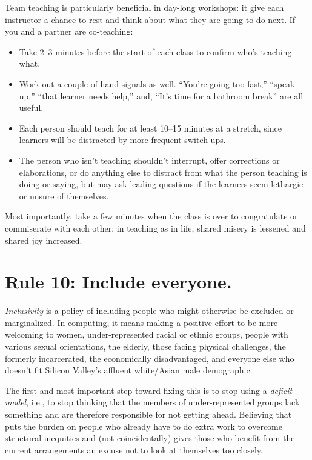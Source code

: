 \documentclass[10pt,letterpaper]{article}
\newcommand{\rulemajor}[1]{\section{#1}}
\begin{document}
Team teaching is particularly beneficial in day-long workshops:
it give each instructor a chance to rest and think about what they are going to do next.
If you and a partner are co-teaching:

\begin{itemize}

\item
  Take 2--3 minutes before the start of each class
  to confirm who's teaching what.

\item
  Work out a couple of hand signals as well.
  ``You're going too fast,''
  ``speak up,''
  ``that learner needs help,''
  and, ``It's time for a bathroom break'' are all useful.

\item
  Each person should teach for at least 10--15 minutes at a stretch,
  since learners will be distracted by more frequent switch-ups.

\item
  The person who isn't teaching shouldn't interrupt,
  offer corrections or elaborations,
  or do anything else to distract from what the person teaching is doing or saying,
  but may ask leading questions
  if the learners seem lethargic or unsure of themselves.

\end{itemize}

Most importantly,
take a few minutes when the class is over to congratulate or commiserate with each other:
in teaching as in life,
shared misery is lessened and shared joy increased.

\rulemajor{Rule 10: Include everyone.}

\emph{Inclusivity} is a policy of including people who might otherwise be excluded or marginalized.
In computing,
it means making a positive effort to be more welcoming to women,
under-represented racial or ethnic groups,
people with various sexual orientations,
the elderly,
those facing physical challenges,
the formerly incarcerated,
the economically disadvantaged,
and everyone else who doesn't fit Silicon Valley's affluent white/Asian male demographic.

The first and most important step toward fixing this is
to stop using a \emph{deficit model},
i.e.,
to stop thinking that the members of under-represented groups lack something
and are therefore responsible for not getting ahead.
Believing that puts the burden on people who already have to do extra work to overcome structural inequities
and (not coincidentally) gives those who benefit from the current arrangements
an excuse not to look at themselves too closely.
\end{document}
